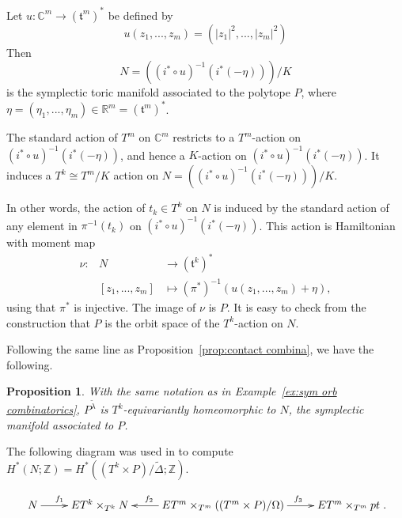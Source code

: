 \documentclass[12pt]{amsart}
\newtheorem{proposition}[theorem]{Proposition}
\theoremstyle{definition}
\numberwithin{equation}{section}
\begin{document}
Let $u:{{\mathbb{C}}}^m\rightarrow (\mathfrak{t}^m)^*$ be defined by
\begin{equation}\label{eq:std moment}
u(z_{1},...,z_{m})=(|z_{1}|^2,...,|z_{m}|^2)
\end{equation}
Then
\begin{equation}\label{eq:toric manifold as quotient}
N=((i^*\circ u)^{-1}(i^{*}(-\eta)))/K
\end{equation}
is the symplectic toric manifold associated to the polytope $P$,
where $\eta=(\eta_{1},...,\eta_{m})\in {{\mathbb{R}}}^m= (\mathfrak{t}^m)^*$.

The standard action of $T^m$ on ${{\mathbb{C}}}^m$ restricts to a $T^m$-action
on $(i^*\circ u)^{-1}(i^{*}(-\eta))$, and hence a $K$-action on
$(i^*\circ u)^{-1}(i^{*}(-\eta))$. It induces a $T^k\cong T^m/K$
action on $N=((i^*\circ u)^{-1}(i^{*}(-\eta)))/K$.

In other words, the action of $t_{k}\in T^k$ on $N$ is induced by
the standard action of any element in $\pi^{-1}(t_{k})$ on
$(i^*\circ u)^{-1}(i^{*}(-\eta))$. This action is Hamiltonian with
moment map
\begin{eqnarray}\label{eq:moment map}
\nu: & N& \rightarrow  (\mathfrak{t}^k)^{*}\\
&[z_{1},...,z_{m}]& \mapsto (\pi^{*})^{-1}(u(z_{1},...,z_{m})+\eta),
\end{eqnarray}
using that $\pi^{*}$ is injective. The image of $\nu$ is $P$. It is
easy to check from the construction that $P$ is the orbit space of
the $T^k$-action on $N$.

Following the same line as Proposition~\ref{prop:contact combina},
we have the following.

\begin{proposition}\label{prop: DJ construction is OK for sym orb}
With the same notation as in Example~\ref{ex:sym orb combinatorics},
$P^{\tilde{\lambda}}$ is $T^{k}$-equivariantly homeomorphic to $N$,
the symplectic manifold associated to $P$.
\end{proposition}

The following diagram was used in \cite{DJ} to compute
$H^{*}(N;{{\mathbb{Z}}})=H^{*}((T^k\times P)/\tilde{\Delta};{{\mathbb{Z}}})$.

\begin{equation}\label{eq:diagram sym orb} \xymatrix{
N\ar[r]^(0.4){f_1} & ET^k\times_{T^k}N & ET^m\times_{T^m}((T^m\times
P)/\Omega) \ar[l]_(0.6){f_2} \ar[r]^(0.6){f_3} &
ET^m\times_{T^m}pt}.
\end{equation}
\end{document}
